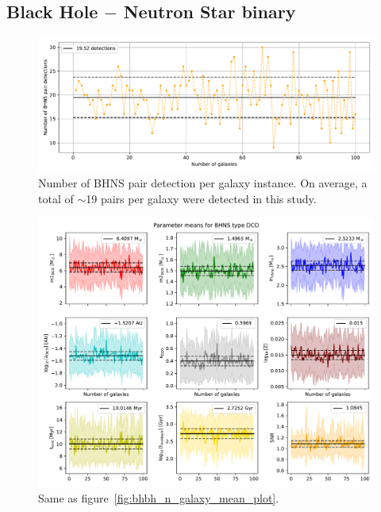 \subsection{Black Hole $-$ Neutron Star binary}
\begin{figure}[!h]
	\centering
	\includegraphics[width=\columnwidth]{analysis_data/main_analysis_folder/BHNS_n_detections}
	\caption{Number of BHNS pair detection per galaxy instance. On average, a total of $\sim$19 pairs per galaxy were detected in this study.}
	\label{fig:bhnsndetections}
\end{figure}	

\begin{figure}[!h]
	\centering
	\includegraphics[width=\columnwidth]{analysis_data/main_analysis_folder/BHNS_n_galaxy_mean_plot}
	\caption{Same as figure~\ref{fig:bhbh_n_galaxy_mean_plot}.}
	\label{fig:bhns_n_galaxy_mean_plot}
\end{figure}

